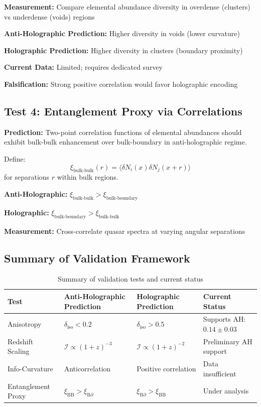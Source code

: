 \documentclass[twocolumn,aps,prd,superscriptaddress,nofootinbib]{revtex4-2}
\begin{document}
\textbf{Measurement:} Compare elemental abundance diversity in overdense (clusters) vs underdense (voids) regions

\textbf{Anti-Holographic Prediction:} Higher diversity in voids (lower curvature)

\textbf{Holographic Prediction:} Higher diversity in clusters (boundary proximity)

\textbf{Current Data:} Limited; requires dedicated survey

\textbf{Falsification:} Strong positive correlation would favor holographic encoding

\subsection{Test 4: Entanglement Proxy via Correlations}

\textbf{Prediction:} Two-point correlation functions of elemental abundances should exhibit bulk-bulk enhancement over bulk-boundary in anti-holographic regime.

Define:
\begin{equation}
\xi_{\text{bulk-bulk}}(r) = \langle \delta N_i(x) \delta N_j(x+r) \rangle
\end{equation}
for separations $r$ within bulk regions.

\textbf{Anti-Holographic:} $\xi_{\text{bulk-bulk}} > \xi_{\text{bulk-boundary}}$

\textbf{Holographic:} $\xi_{\text{bulk-boundary}} > \xi_{\text{bulk-bulk}}$

\textbf{Measurement:} Cross-correlate quasar spectra at varying angular separations

\subsection{Summary of Validation Framework}

\begin{table}[t]
\centering
\caption{Summary of validation tests and current status}
\label{tab:validation_tests}
\begin{tabular}{p{3cm}p{4cm}p{4cm}p{3cm}}
\toprule
\textbf{Test} & \textbf{Anti-Holographic Prediction} & \textbf{Holographic Prediction} & \textbf{Current Status} \\
\midrule
Anisotropy & $\delta_{\text{iso}} < 0.2$ & $\delta_{\text{iso}} > 0.5$ & Supports AH: $0.14 \pm 0.03$ \\
Redshift Scaling & $\mathcal{I} \propto (1+z)^{-3}$ & $\mathcal{I} \propto (1+z)^{-2}$ & Preliminary AH support \\
Info-Curvature & Anticorrelation & Positive correlation & Data insufficient \\
Entanglement Proxy & $\xi_{\text{BB}} > \xi_{\text{B}\partial}$ & $\xi_{\text{B}\partial} > \xi_{\text{BB}}$ & Under analysis \\
\bottomrule
\end{tabular}
\end{table}
\end{document}

